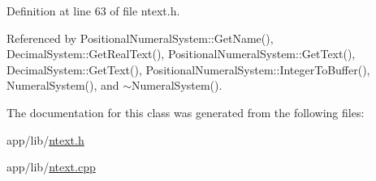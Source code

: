 Definition at line 63 of file ntext.\+h.



Referenced by Positional\+Numeral\+System\+::\+Get\+Name(), Decimal\+System\+::\+Get\+Real\+Text(), Positional\+Numeral\+System\+::\+Get\+Text(), Decimal\+System\+::\+Get\+Text(), Positional\+Numeral\+System\+::\+Integer\+To\+Buffer(), Numeral\+System(), and $\sim$\+Numeral\+System().



The documentation for this class was generated from the following files\+:\begin{DoxyCompactItemize}
\item 
app/lib/\hyperlink{ntext_8h}{ntext.\+h}\item 
app/lib/\hyperlink{ntext_8cpp}{ntext.\+cpp}\end{DoxyCompactItemize}
